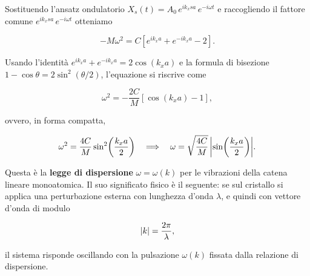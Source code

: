 Sostituendo l'ansatz ondulatorio \( X_s(t) = A_0 \, e^{i k_x s a} \, e^{-i \omega t} \) e raccogliendo il fattore comune \( e^{i k_x s a} \, e^{-i \omega t} \) otteniamo

\begin{equation}
    -M \omega^{2} = C \left[ e^{i k_x a} + e^{-i k_x a} - 2 \right].
\end{equation}

Usando l'identità \( e^{i k_x a} + e^{-i k_x a} = 2 \cos(k_x a) \) e la formula di bisezione \( 1 - \cos\theta = 2 \sin^{2}(\theta/2) \), l'equazione si riscrive come

\begin{equation}
    \omega^{2} = -\frac{2C}{M} \left[ \cos(k_x a) - 1 \right],
\end{equation}

ovvero, in forma compatta,

\begin{importantbox}
    \begin{equation}
        \omega^{2} = \frac{4C}{M} \sin^{2}\!\left( \frac{k_x a}{2} \right)
        \quad \Longrightarrow \quad
        \omega = \sqrt{\frac{4C}{M}} \, \abs{\sin\!\left( \frac{k_x a}{2} \right)}.
    \end{equation}
\end{importantbox}

Questa è la \textbf{legge di dispersione} \( \omega = \omega(k) \) per le vibrazioni della catena lineare monoatomica. Il suo significato fisico è il seguente: se sul cristallo si applica una perturbazione esterna con lunghezza d'onda \( \lambda \), e quindi con vettore d'onda di modulo

\begin{equation}
    \abs{k} = \frac{2\pi}{\lambda},
\end{equation}

il sistema risponde oscillando con la pulsazione \( \omega(k) \) fissata dalla relazione di dispersione.

